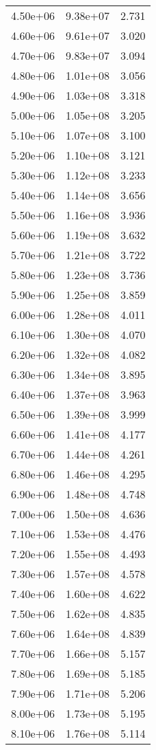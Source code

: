 \begin{table}
\begin{tabular}{lll}
4.50e+06 & 9.38e+07 & 2.731 \\
4.60e+06 & 9.61e+07 & 3.020 \\
4.70e+06 & 9.83e+07 & 3.094 \\
4.80e+06 & 1.01e+08 & 3.056 \\
4.90e+06 & 1.03e+08 & 3.318 \\
5.00e+06 & 1.05e+08 & 3.205 \\
5.10e+06 & 1.07e+08 & 3.100 \\
5.20e+06 & 1.10e+08 & 3.121 \\
5.30e+06 & 1.12e+08 & 3.233 \\
5.40e+06 & 1.14e+08 & 3.656 \\
5.50e+06 & 1.16e+08 & 3.936 \\
5.60e+06 & 1.19e+08 & 3.632 \\
5.70e+06 & 1.21e+08 & 3.722 \\
5.80e+06 & 1.23e+08 & 3.736 \\
5.90e+06 & 1.25e+08 & 3.859 \\
6.00e+06 & 1.28e+08 & 4.011 \\
6.10e+06 & 1.30e+08 & 4.070 \\
6.20e+06 & 1.32e+08 & 4.082 \\
6.30e+06 & 1.34e+08 & 3.895 \\
6.40e+06 & 1.37e+08 & 3.963 \\
6.50e+06 & 1.39e+08 & 3.999 \\
6.60e+06 & 1.41e+08 & 4.177 \\
6.70e+06 & 1.44e+08 & 4.261 \\
6.80e+06 & 1.46e+08 & 4.295 \\
6.90e+06 & 1.48e+08 & 4.748 \\
7.00e+06 & 1.50e+08 & 4.636 \\
7.10e+06 & 1.53e+08 & 4.476 \\
7.20e+06 & 1.55e+08 & 4.493 \\
7.30e+06 & 1.57e+08 & 4.578 \\
7.40e+06 & 1.60e+08 & 4.622 \\
7.50e+06 & 1.62e+08 & 4.835 \\
7.60e+06 & 1.64e+08 & 4.839 \\
7.70e+06 & 1.66e+08 & 5.157 \\
7.80e+06 & 1.69e+08 & 5.185 \\
7.90e+06 & 1.71e+08 & 5.206 \\
8.00e+06 & 1.73e+08 & 5.195 \\
8.10e+06 & 1.76e+08 & 5.114 \\

\end{tabular}
\end{table}
